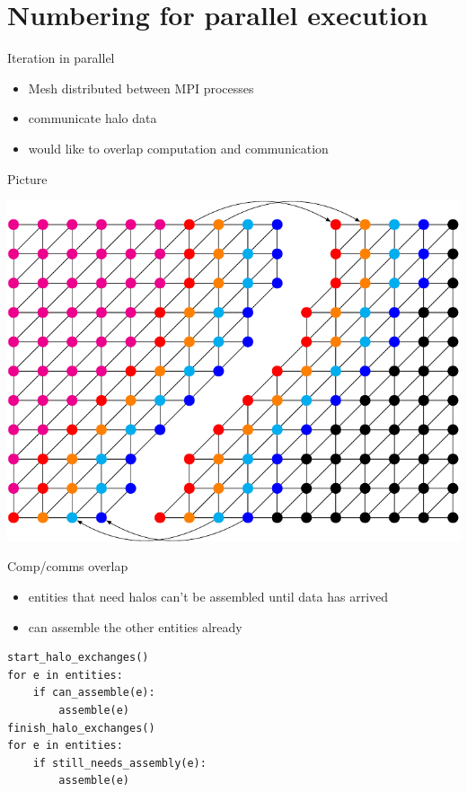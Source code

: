 \documentclass[presentation]{beamer}
\begin{document}
\section{Numbering for parallel execution}
\label{sec:orgheadline18}
\begin{frame}[label={sec:orgheadline11}]{Iteration in parallel}
\begin{itemize}
\item Mesh distributed between MPI processes
\item communicate halo data
\item would like to overlap computation and communication
\end{itemize}
\end{frame}

\begin{frame}[label={sec:orgheadline12}]{Picture}
\begin{center}
\includegraphics[width=\textwidth]{03-18-FEniCS-mesh-numbering.figures/mpi-mesh}
\end{center}
\end{frame}
\begin{frame}[fragile,label={sec:orgheadline13}]{Comp/comms overlap}
 \begin{itemize}
\item entities that need halos can't be assembled until data has arrived
\item can assemble the other entities already
\end{itemize}
\begin{verbatim}
start_halo_exchanges()
for e in entities:
    if can_assemble(e):
        assemble(e)
finish_halo_exchanges()
for e in entities:
    if still_needs_assembly(e):
        assemble(e)
\end{verbatim}
\end{frame}
\end{document}
